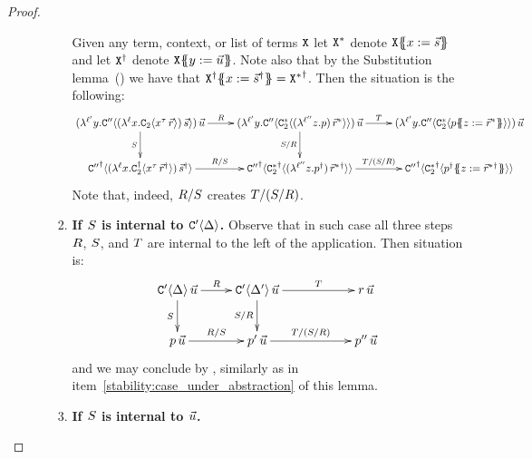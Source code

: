 \begin{proof}
\begin{enumerate}
\begin{enumerate}
\begin{enumerate}
      Given any term, context, or list of terms $\mathtt{X}$ let $\mathtt{X}^*$ denote $\mathtt{X}\{\!\!\{x := \vec{s}\}\!\!\}$
      and let $\mathtt{X}^\dagger$ denote $\mathtt{X}\{\!\!\{y := \vec{u}\}\!\!\}$.
      Note also that by the Substitution lemma~() we have that
      $\mathtt{X}^\dagger\{\!\!\{x := \vec{s}^\dagger\}\!\!\} = {\mathtt{X}^*}^\dagger$.
      Then the situation is the following:
      {\small
      \[
        \xymatrix{
          (\lamp{\labtwo}{\vartwo}{\con''\of{ (\lamp{\lab}{\var}{\con_2\of{\var^\typ\,\ls{\tmfour}}})\,\ls{\tmtwo} }})\,\ls{\tmthree}
          \ar[r]^-{\redex}
          \ar[d]_-{\redextwo}
        &
          (\lamp{\labtwo}{\vartwo}{\con''\of{ \con_2^*\of{(\lamp{\labthree}{\varthree}{\tmfive})\,\ls{\tmfour}^*}}})\,\ls{\tmthree}
          \ar[d]_-{\redextwo/\redex}
          \ar[r]^-{\redexthree}
        &
          (\lamp{\labtwo}{\vartwo}{\con''\of{ \con_2^*\of{  \tmfive\sub{\varthree}{\ls{\tmfour}^*} }}})\,\ls{\tmthree}
        \\
          {\con''}^\dagger\of{(\lamp{\lab}{\var}{\con_2^\dagger\of{\var^\typ\,\ls{\tmfour}^\dagger}})\,\ls{\tmtwo}^\dagger}
          \ar[r]^-{\redex/\redextwo}
        &
          {\con''}^\dagger\of{ {\con_2^*}^\dagger\of{(\lamp{\labthree}{\varthree}{\tmfive^\dagger})\,{\ls{\tmfour}^*}{}^\dagger} }
          \ar[r]^-{\redexthree/(\redextwo/\redex)}
        &
          {\con''}^\dagger\of{ {\con_2^*}^\dagger\of{  \tmfive^\dagger\sub{\varthree}{{\ls{\tmfour}^*}{}^\dagger} } }
        }
      \]}
      Note that, indeed, $R/S$ creates $T/(S/R)$.
    \item {\bf If $S$ is internal to $\mathtt{C}'\langle\Delta\rangle$.}
      Observe that in such case all three steps $R$, $S$, and $T$ are internal to the left 
      of the application. Then situation is:
      \[
        \xymatrix{
          \con'\of{\Delta}\,\ls{\tmthree}
          \ar[r]^-{\redex}
          \ar[d]_-{\redextwo}
        &
          \con'\of{\Delta'}\,\ls{\tmthree}
          \ar[d]_-{\redextwo/\redex}
          \ar[rr]^-{\redexthree}
        &&
          \tmfour\,\ls{\tmthree}
        \\
          \tmfive\,\ls{\tmthree}
          \ar[r]^-{\redex/\redextwo}
        &
          \tmfive'\,\ls{\tmthree}
          \ar[rr]^-{\redexthree/(\redextwo/\redex)}
        &&
          \tmfive''\,\ls{\tmthree}
        }
      \]
      and we may conclude by \ih, similarly as in item~\ref{stability:case_under_abstraction} of this lemma.
    \item {\bf If $S$ is internal to $\vec{u}$.}

\end{enumerate}
\end{enumerate}
\end{enumerate}
\end{proof}

